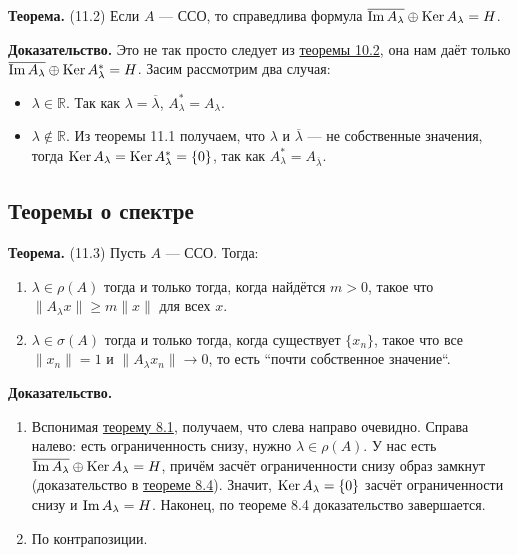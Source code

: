 \label{th:11-2} \textbf{Теорема.} (11.2) Если $A$ --- ССО, то справедлива формула $\overline{\operatorname{Im} A_\lambda} \oplus \operatorname{Ker} A_\lambda = H$.

\textbf{Доказательство.} Это не так просто следует из \hyperref[th:10-2]{теоремы 10.2}, она нам даёт только $\overline{\operatorname{Im} A_\lambda} \oplus \operatorname{Ker} A_\lambda^* = H$.
Засим рассмотрим два случая:
\begin{itemize}
    \item $\lambda \in \mathbb R$. Так как $\lambda = \overline \lambda$, $A^*_\lambda = A_\lambda$.
    \item $\lambda \not\in \mathbb R$.
        Из теоремы 11.1 получаем, что $\lambda$ и $\overline \lambda$ --- не собственные значения, тогда $\operatorname{Ker} A_\lambda = \operatorname{Ker} A^*_\lambda = \{0\}$, так как $A^*_\lambda = A_{\overline \lambda}$.
\end{itemize}

\QED

\subsection{Теоремы о спектре}
\label{th:11-3} \textbf{Теорема.} (11.3) Пусть $A$ --- ССО.
Тогда:
\begin{enumerate}
    \item $\lambda \in \rho(A)$ тогда и только тогда, когда найдётся $m > 0$, такое что $\|A_\lambda x\| \ge m \|x\|$ для всех $x$.
    \item $\lambda \in \sigma(A)$ тогда и только тогда, когда существует $\{x_n\}$, такое что все $\|x_n\| = 1$ и $\|A_\lambda x_n\| \to 0$, то есть ``почти собственное значение``.
\end{enumerate}

\textbf{Доказательство.} 
\begin{enumerate}
    \item Вспонимая \hyperref[th:8-1]{теорему 8.1}, получаем, что слева направо очевидно.
        Справа налево: есть ограниченность снизу, нужно $\lambda \in \rho(A)$.
        У нас есть $\overline{\operatorname{Im} A_\lambda} \oplus \operatorname{Ker} A_\lambda = H$, причём засчёт ограниченности снизу образ замкнут (доказательство в \hyperref[th:8-4]{теореме 8.4}).
        Значит, $\operatorname{Ker} A_\lambda = \{0\}$ засчёт ограниченности снизу и $\operatorname{Im} A_\lambda = H$.
        Наконец, по теореме 8.4 доказательство завершается.

    \item По контрапозиции.
\end{enumerate}

